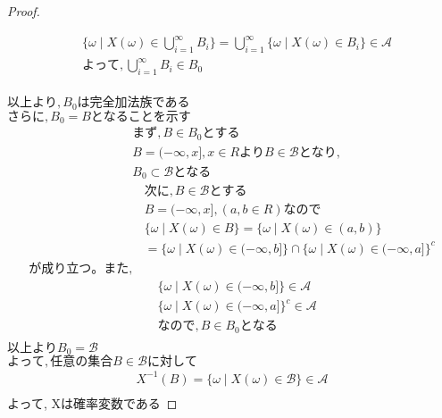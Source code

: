 \documentclass[dvipdfmx,10pt, a4j]{jarticle}
\theoremstyle{definition}
\begin{document}
\begin{proof}
\begin{enumerate}[i)]
            \begin{align*}
                &\{\omega \mid X(\omega) \in \bigcup_{i=1}^{\infty}{B_i}\} = \bigcup_{i=1}^{\infty}{\{\omega \mid X(\omega) \in B_i\}} \in \mathcal{A}\\
                &よって,\bigcup_{i=1}^{\infty}{B_i} \in B_0\\
            \end{align*}
        \end{enumerate}
        $以上より, B_0 は完全加法族である$\\
        $さらに, B_0 = B となることを示す$\\
        \begin{align*}
            &まず,B \in B_0 とする\\
            &B = (- \infty, x], x \in Rより B \in \mathcal{B} となり,\\
            &B_0 \subset \mathcal{B} となる
        \end{align*}
        \begin{align*}
            &次に, B \in \mathcal{B} とする\\
            &B = (- \infty, x], (a, b \in R)なので\\
            &\{\omega \mid X(\omega) \in B\} = \{\omega \mid X(\omega) \in (a, b)\}\\
            &=\{\omega \mid X(\omega) \in (- \infty, b]\} \cap \{\omega \mid X(\omega) \in (- \infty, a]\}^{c}\\
            が成り立つ。また,
        \end{align*}
        \begin{align*}
            &\{\omega \mid X(\omega) \in (- \infty, b]\} \in \mathcal{A}\\
            &\{\omega \mid X(\omega) \in (- \infty, a]\}^{c} \in \mathcal{A}\\
            &なので, B \in B_0 となる\\
        \end{align*}
        $以上より B_0 = \mathcal{B}$\\
        $よって, 任意の集合B \in \mathcal{B} に対して$\\
        \begin{align*}
            X^{-1}(B) = \{\omega \mid X(\omega) \in \mathcal{B}\} \in \mathcal{A}\\
        \end{align*}
        よって, Xは確率変数である
    \end{proof}
\end{document}
